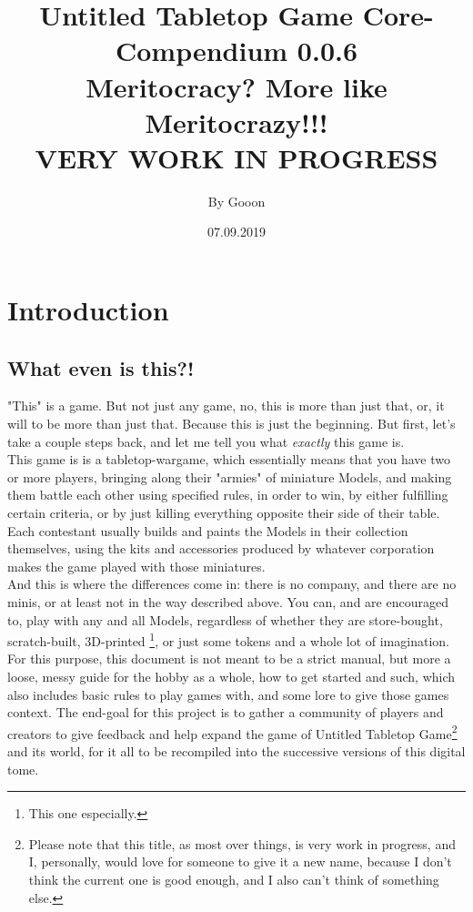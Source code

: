 \documentclass[a4paper,12pt]{report}
\begin{document}
\title{\Large{\textbf{Untitled Tabletop Game Core-Compendium 0.0.6\\ Meritocracy? More like Meritocrazy!!! \\ VERY WORK IN PROGRESS}}}
\author{By Gooon}
\date{07.09.2019}

\maketitle
\let\cleardoublepage\clearpage
\tableofcontents
\pagebreak

\chapter{Introduction}
\section{What even is this?!}
"This" is a game. But not just any game, no, this is more than just that, or,  it will to be more than just that. Because this is just the beginning. But first, let's take a couple steps back, and let me tell you what \textit{exactly} this game is. \\
This game is is a tabletop-wargame, which essentially means that you have two or more players, bringing along their "armies" of miniature Models, and making them battle each other using specified rules, in order to win, by either fulfilling certain criteria, or by just killing everything opposite their side of their table. Each contestant usually builds and paints the Models in their collection themselves, using the kits and accessories produced by whatever corporation makes the game played with those miniatures. \\
And this is where the differences come in: there is no company, and there are no minis, or at least not in the way described above. You can, and are encouraged to, play with any and all Models, regardless of whether they are store-bought, scratch-built, 3D-printed \footnote{This one especially.}, or just some tokens and a whole lot of imagination. For this purpose, this document is not meant to be a strict manual, but more a loose, messy guide for the hobby as a whole, how to get started and such, which also includes basic rules to play games with, and some lore to give those games context. The end-goal for this project is to gather a community of players and creators to give feedback and help expand the game of Untitled Tabletop Game\footnote{Please note that this title, as most over things, is very work in progress, and I, personally, would love for someone to give it a new name, because I don't think the current one is good enough, and I also can't think of something else.} and its world, for it all to be recompiled into the successive versions of this digital tome.
\end{document}
